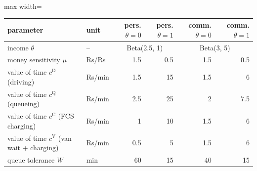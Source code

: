 \begin{adjustbox}{max width=\textwidth}\begin{tabular}{llrrrr}\toprule
parameter & unit & pers. $\theta=0$ & pers. $\theta=1$ & comm. $\theta=0$ & comm. $\theta=1$ \\ \midrule
income $\theta$ & -- & \multicolumn{2}{c}{Beta(2.5, 1)} & \multicolumn{2}{c}{Beta(3, 5)} \\
money sensitivity $\mu$ & Rs/Rs & 1.5 & 0.5 & 1.5 & 0.5 \\
value of time $c^{\mathrm D}$ (driving) & Rs/min & 1.5 & 15 & 1.5 & 6 \\
value of time $c^{\mathrm Q}$ (queueing) & Rs/min & 2.5 & 25 & 2 & 7.5 \\
value of time $c^{\mathrm C}$ (FCS charging) & Rs/min & 1 & 10 & 1.5 & 6 \\
value of time $c^{\mathrm V}$ (van wait + charging) & Rs/min & 0.5 & 5 & 1.5 & 6 \\
queue tolerance $W$ & min & 60 & 15 & 40 & 15 \\
\bottomrule\end{tabular}\end{adjustbox}
